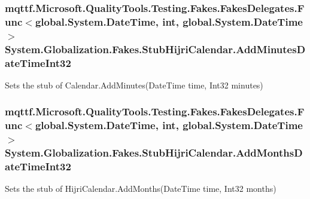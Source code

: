 \hypertarget{class_system_1_1_globalization_1_1_fakes_1_1_stub_hijri_calendar_a185be751707d3a4898643b60645c177a}{
\subsubsection[{Add\-Minutes\-Date\-Time\-Int32}]{\setlength{\rightskip}{0pt plus 5cm}mqttf.\-Microsoft.\-Quality\-Tools.\-Testing.\-Fakes.\-Fakes\-Delegates.\-Func$<$global.\-System.\-Date\-Time, int, global.\-System.\-Date\-Time$>$ System.\-Globalization.\-Fakes.\-Stub\-Hijri\-Calendar.\-Add\-Minutes\-Date\-Time\-Int32}}\label{class_system_1_1_globalization_1_1_fakes_1_1_stub_hijri_calendar_a185be751707d3a4898643b60645c177a}


Sets the stub of Calendar.\-Add\-Minutes(\-Date\-Time time, Int32 minutes)

\hypertarget{class_system_1_1_globalization_1_1_fakes_1_1_stub_hijri_calendar_a386fdb458579b27e076da11b23b12f2c}{
\subsubsection[{Add\-Months\-Date\-Time\-Int32}]{\setlength{\rightskip}{0pt plus 5cm}mqttf.\-Microsoft.\-Quality\-Tools.\-Testing.\-Fakes.\-Fakes\-Delegates.\-Func$<$global.\-System.\-Date\-Time, int, global.\-System.\-Date\-Time$>$ System.\-Globalization.\-Fakes.\-Stub\-Hijri\-Calendar.\-Add\-Months\-Date\-Time\-Int32}}\label{class_system_1_1_globalization_1_1_fakes_1_1_stub_hijri_calendar_a386fdb458579b27e076da11b23b12f2c}


Sets the stub of Hijri\-Calendar.\-Add\-Months(\-Date\-Time time, Int32 months)

